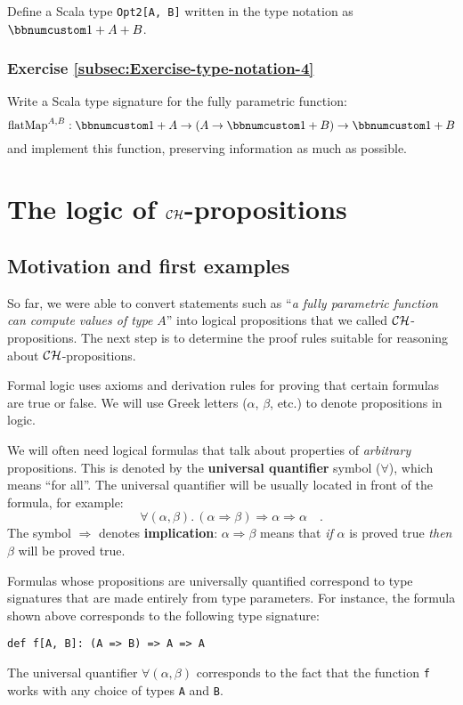 Define a Scala type \lstinline!Opt2[A, B]! written in the type notation
as $\bbnum 1+A+B$.

\subsubsection{Exercise \label{subsec:Exercise-type-notation-4}\ref{subsec:Exercise-type-notation-4}}

Write a Scala type signature for the fully parametric function:
\[
\text{flatMap}^{A,B}:\bbnum 1+A\rightarrow\left(A\rightarrow\bbnum 1+B\right)\rightarrow\bbnum 1+B
\]
and implement this function, preserving information as much as possible.

\section{The logic of ${\cal CH}$-propositions}

\subsection{Motivation and first examples\label{subsec:ch-Motivation-and-first-examples}}

So far, we were able to convert statements such as \textsf{``}\emph{a fully
parametric function can compute values of type} $A$\textsf{''} into logical
propositions that we called ${\cal CH}$-propositions. The next step
is to determine the proof rules suitable for reasoning about ${\cal CH}$-propositions.

Formal logic uses axioms and derivation rules for proving that certain
formulas are true or false. We will use Greek letters ($\alpha$,
$\beta$, etc.) to denote propositions in logic.

We will often need logical formulas that talk about properties of
\emph{arbitrary} propositions. This is denoted by the \textbf{universal
quantifier}
symbol ($\forall$), which means \textsf{``}for all\textsf{''}. The universal quantifier
will be usually located in front of the formula, for example:
\[
\forall(\alpha,\beta).\,\left(\alpha\Rightarrow\beta\right)\Rightarrow\alpha\Rightarrow\alpha\quad.
\]
The symbol $\Rightarrow$ denotes \textbf{implication}:
$\alpha\Rightarrow\beta$ means that \emph{if} $\alpha$ is proved
true \emph{then} $\beta$ will be proved true.

Formulas whose propositions are universally quantified correspond
to type signatures that are made entirely from type parameters. For
instance, the formula shown above corresponds to the following type
signature:
\begin{lstlisting}
def f[A, B]: (A => B) => A => A
\end{lstlisting}
The universal quantifier $\forall(\alpha,\beta)$ corresponds to the
fact that the function \lstinline!f! works with any choice of types
\lstinline!A! and \lstinline!B!.

